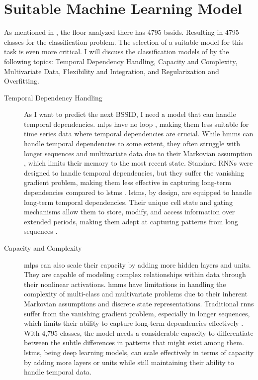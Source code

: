 \chapter{Suitable Machine Learning Model}\label{ch:discuss-ml}

As mentioned in , the floor analyzed there has 4795 \acp{bssid}.
Resulting in 4795 classes for the classification problem.
The selection of a suitable model for this task is even more critical.
I will discuss the classification models of  by the following topics: Temporal Dependency Handling, Capacity and Complexity, Multivariate Data, Flexibility and Integration, and Regularization and Overfitting. \\

\begin{description}
\item[Temporal Dependency Handling]
As I want to predict the next BSSID, I need a model that can handle temporal dependencies.
\acp{mlp} have no loop \cite{mlp_and_nn}, making them less suitable for time series data where temporal dependencies are crucial.
While \acp{hmm} can handle temporal dependencies to some extent, they often struggle with longer sequences and multivariate data due to their Markovian assumption \cite{hmm-rabiner-1989}, which limits their memory to the most recent state.
Standard RNNs were designed to handle temporal dependencies, but they suffer the vanishing gradient problem, making them less effective in capturing long-term dependencies compared to \acp{lstm} \cite{rnn_difficulties_2013}.
\acp{lstm}, by design, are equipped to handle long-term temporal dependencies. Their unique cell state and gating mechanisms allow them to store, modify, and access information over extended periods, making them adept at capturing patterns from long sequences \cite{lstm-hochreiter}.
\end{description}

\begin{description}
\item[Capacity and Complexity]
\acp{mlp} can also scale their capacity by adding more hidden layers and units.
They are capable of modeling complex relationships within data through their nonlinear activations.
\acp{hmm} have limitations in handling the complexity of multi-class and multivariate problems due to their inherent Markovian assumptions and discrete state representations.
Traditional \acp{rnn} suffer from the vanishing gradient problem, especially in longer sequences, which limits their ability to capture long-term dependencies effectively \cite{rnn_difficulties_2013}.
With 4,795 classes, the model needs a considerable capacity to differentiate between the subtle differences in patterns that might exist among them. 
\acp{lstm}, being deep learning models, can scale effectively in terms of capacity by adding more layers or units while still maintaining their ability to handle temporal data.
\end{description}

